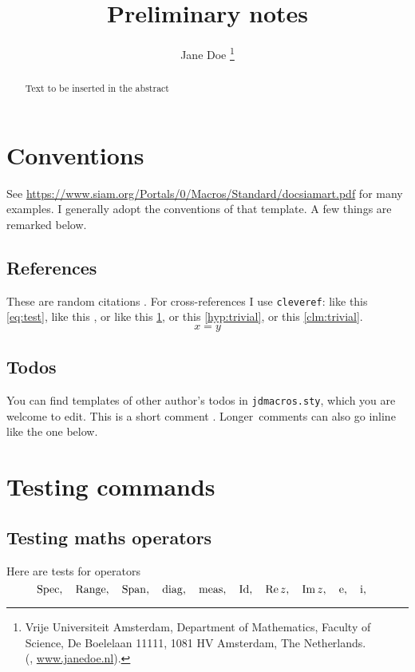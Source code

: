 \documentclass[a4paper]{siamart190516}
\title{Preliminary notes}
\author{%
  Jane Doe%
  \thanks{%
    Vrije Universiteit Amsterdam,
    Department of Mathematics,
    Faculty of Science,
    De Boelelaan 11111,
    1081 HV Amsterdam, The Netherlands.
  \protect\\
    (\email{jane.doe@vu.nl}, \url{www.janedoe.nl}).
  }
}
\begin{document}
\maketitle

\begin{abstract}
  Text to be inserted in the abstract
\end{abstract}

\section{Conventions} \label{sec:conventions}
See \url{https://www.siam.org/Portals/0/Macros/Standard/docsiamart.pdf} for many examples. I generally adopt the conventions of
that template. A few things are remarked below.

\subsection{References} \label{sec:references}
These are random citations \cite{KoMa14,siam}. For cross-references I use
\texttt{cleveref}: like this
\cref{eq:test}, like this , or like this \cref{sec:conventions}, or
this \cref{hyp:trivial}, or this \cref{clm:trivial}.
\begin{equation}\label{eq:test}
  x = y
\end{equation}


\subsection{Todos}
You can find templates of other author's todos in
\texttt{jdmacros.sty}, which you are welcome to edit.
This is a short comment . Longer comments can also go
inline like the one below.
% 

\section{Testing commands}

\subsection{Testing maths operators}
Here are tests for operators
\[
  \operatorname{Spec}, \quad 
  \operatorname{Range}, \quad 
  \operatorname{Span}, \quad
  \operatorname{diag}, \quad
  \operatorname{meas}, \quad
  \operatorname{Id}, \quad
  \operatorname{Re} z, \quad
  \operatorname{Im} z, \quad
  \operatorname{e}, \quad
  \operatorname{i}, \quad
\]
\end{document}
